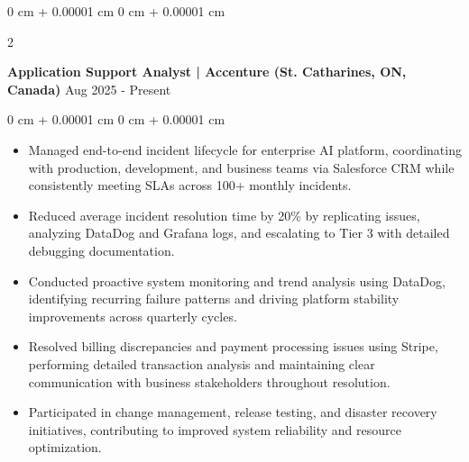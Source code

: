 \documentclass[10pt, letterpaper]{article}
\newenvironment{highlights}{
    \begin{itemize}[
        topsep=0.10 cm,
        parsep=0.10 cm,
        partopsep=0pt,
        itemsep=0pt,
        leftmargin=0 cm + 10pt
    ]
}{
    \end{itemize}
} %
\newenvironment{onecolentry}{
    \begin{adjustwidth}{
        0 cm + 0.00001 cm
    }{
        0 cm + 0.00001 cm
    }
}{
    \end{adjustwidth}
} %
\newenvironment{twocolentry}[2][]{
    \onecolentry
    \def\secondColumn{#2}
    \setcolumnwidth{\fill, 4.5 cm}
    \begin{paracol}{2}
}{
    \switchcolumn \raggedleft \secondColumn
    \end{paracol}
    \endonecolentry
} %
\begin{document}
        \begin{twocolentry}{
            {Aug 2025 - Present}
        }
            \textbf{Application Support Analyst | Accenture (St. Catharines, ON, Canada)}\end{twocolentry}
        \vspace{0.10 cm}
        \begin{onecolentry}
            \begin{highlights}
                \item Managed end-to-end incident lifecycle for enterprise AI platform, coordinating with production, development, and business teams via Salesforce CRM while consistently meeting SLAs across 100+ monthly incidents.
                \item Reduced average incident resolution time by 20\% by replicating issues, analyzing DataDog and Grafana logs, and escalating to Tier 3 with detailed debugging documentation.
                \item Conducted proactive system monitoring and trend analysis using DataDog, identifying recurring failure patterns and driving platform stability improvements across quarterly cycles.
                \item Resolved billing discrepancies and payment processing issues using Stripe, performing detailed transaction analysis and maintaining clear communication with business stakeholders throughout resolution.
                \item Participated in change management, release testing, and disaster recovery initiatives, contributing to improved system reliability and resource optimization.
            \end{highlights}
        \end{onecolentry}
    
\end{document}
